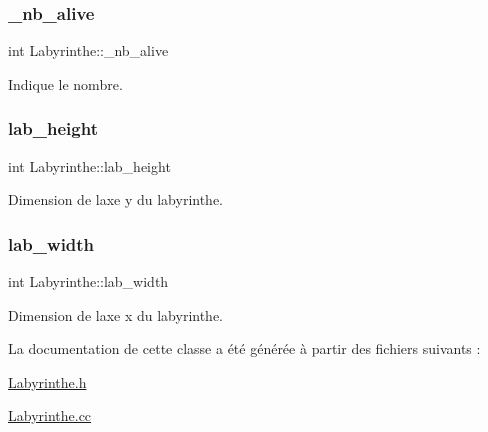\mbox{\label{classLabyrinthe_ad97a56882b720fa0f94acffde1d2c275}} 
\subsubsection{\texorpdfstring{\+\_\+nb\+\_\+alive}{\_nb\_alive}}
{\footnotesize\ttfamily int Labyrinthe\+::\+\_\+nb\+\_\+alive\hspace{0.3cm}{\ttfamily [private]}}



Indique le nombre. 

\mbox{\label{classLabyrinthe_af48dc244a25af5aac1a9fca668dee82d}} 
\subsubsection{\texorpdfstring{lab\+\_\+height}{lab\_height}}
{\footnotesize\ttfamily int Labyrinthe\+::lab\+\_\+height\hspace{0.3cm}{\ttfamily [private]}}



Dimension de l\textquotesingle{}axe \textquotesingle{}y\textquotesingle{} du labyrinthe. 

\mbox{\label{classLabyrinthe_a6ae1d76761645024106ad6374305dd02}} 
\subsubsection{\texorpdfstring{lab\+\_\+width}{lab\_width}}
{\footnotesize\ttfamily int Labyrinthe\+::lab\+\_\+width\hspace{0.3cm}{\ttfamily [private]}}



Dimension de l\textquotesingle{}axe \textquotesingle{}x\textquotesingle{} du labyrinthe. 



La documentation de cette classe a été générée à partir des fichiers suivants \+:\begin{DoxyCompactItemize}
\item 
\hyperlink{Labyrinthe_8h}{Labyrinthe.\+h}\item 
\hyperlink{Labyrinthe_8cc}{Labyrinthe.\+cc}\end{DoxyCompactItemize}
